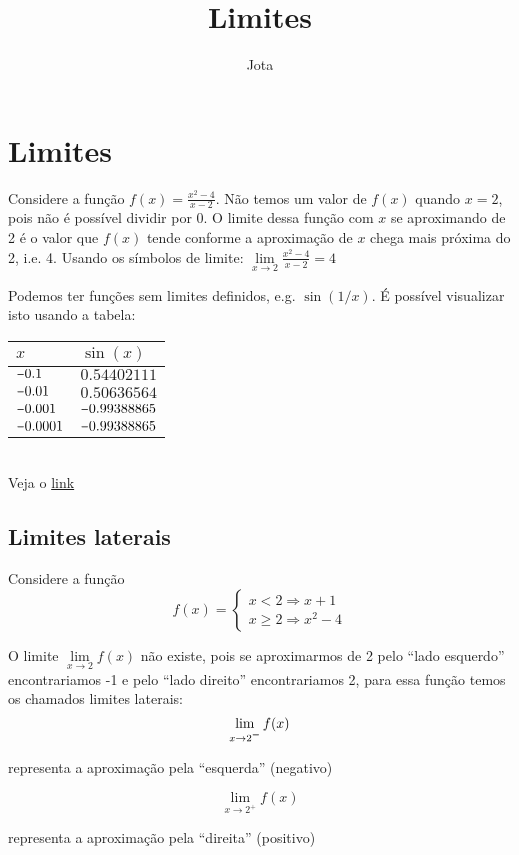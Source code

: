 \documentclass[12pt,a4paper]{article}
\title{Limites}
\author{Jota}
\newcommand{\minus}{\scalebox{0.75}[1.0]{$-$}}
\begin{document}
\maketitle

\section*{Limites}
Considere a função $f(x) = \frac{x^2 - 4}{x-2}$.
Não temos um valor de $f(x)$ quando $x=2$, pois não é possível dividir por 0.
O limite dessa função com $x$ se aproximando de 2 é o valor que $f(x)$ tende conforme
a aproximação de $x$ chega mais próxima do 2, i.e. 4.
Usando os símbolos de limite: $\lim\limits_{x \to 2} \frac{x^2 - 4}{x-2} = 4$

Podemos ter funções sem limites definidos, e.g. $\sin(1/x)$. É possível visualizar isto usando a tabela:
\begin{center}
	\begin{tabular}{l|l}
		$x$       & $\sin(x)$     \\ \hline
		$\minus0.1$    & $0.54402111$  \\
		$\minus0.01$   & $0.50636564$  \\
		$\minus0.001$  & $\minus0.99388865$ \\
		$\minus0.0001$ & $\minus0.99388865$ 
	\end{tabular} \\
	Veja o \href{https://www.mathway.com/pt/popular-problems/Calculus/501510}{link}
\end{center}

\subsection*{Limites laterais}
Considere a função \[f(x) =
	\begin{cases}
		x < 2 \Rightarrow x + 1 \\
		x \ge 2 \Rightarrow x^2 - 4
	\end{cases}
\]

O limite $\lim\limits_{x \to 2} f(x)$ não existe, pois se aproximarmos de 2 pelo ``lado esquerdo'' encontrariamos -1
e pelo ``lado direito'' encontrariamos 2, para essa função temos os chamados limites laterais:
\[\lim\limits_{x \to 2^{\minus}} f(x)\]
\begin{center}
	representa a aproximação pela ``esquerda'' (negativo)
\end{center}
\[\lim\limits_{x \to 2^{+}} f(x)\]
\begin{center}
	representa a aproximação pela ``direita'' (positivo)
\end{center}
\end{document}
